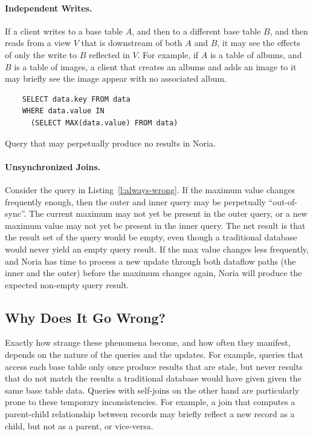 \paragraph{Independent Writes.}
If a client writes to a base table $A$, and then to a different base table $B$,
and then reads from a view $V$ that is downstream of both $A$ and $B$, it may
see the effects of only the write to $B$ reflected in $V$. For example, if $A$
is a table of albums, and $B$ is a table of images, a client that creates an
albums and adds an image to it may briefly see the image appear with no
associated album.

\begin{listing}[h]
  \begin{verbatim}
    SELECT data.key FROM data
    WHERE data.value IN
      (SELECT MAX(data.value) FROM data)
  \end{verbatim}
  \caption{Query that may perpetually produce no results in Noria.}
  \label{l:always-wrong}
\end{listing}

\paragraph{Unsynchronized Joins.}
Consider the query in Listing~\vref{l:always-wrong}. If the maximum value
changes frequently enough, then the outer and inner query may be perpetually
``out-of-sync''. The current maximum may not yet be present in the outer query,
or a new maximum value may not yet be present in the inner query. The net result
is that the result set of the query would be empty, even though a traditional
database would never yield an empty query result. If the max value changes less
frequently, and Noria has time to process a new update through both dataflow
paths (the inner and the outer) before the maximum changes again, Noria will
produce the expected non-empty query result.

\subsection{Why Does It Go Wrong?}

Exactly how strange these phenomena become, and how often they manifest, depends
on the nature of the queries and the updates. For example, queries that access
each base table only once produce results that are stale, but never results that
do not match the results a traditional database would have given given the same
base table data. Queries with self-joins on the other hand are particularly
prone to these temporary inconsistencies. For example, a join that computes a
parent-child relationship between records may briefly reflect a new record as a
child, but not as a parent, or vice-versa.

